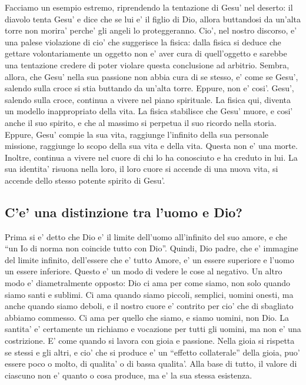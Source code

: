 Facciamo un esempio estremo, riprendendo la tentazione di Gesu' nel deserto: il diavolo tenta Gesu' e dice che se lui e' il figlio di Dio, allora buttandosi da un'alta torre non morira' perche' gli angeli lo proteggeranno. Cio', nel nostro discorso, e' una palese violazione di cio' che suggerisce la fisica: dalla fisica si deduce che gettare volontariamente un oggetto non e' aver cura di quell'oggetto e sarebbe una tentazione credere di poter violare questa conclusione ad arbitrio. Sembra, allora, che Gesu' nella sua passione non abbia cura di se stesso, e' come se Gesu', salendo sulla croce si stia buttando da un'alta torre. Eppure, non e' cosi'. Gesu', salendo sulla croce, continua a vivere nel piano spirituale. La fisica qui, diventa un modello inappropriato della vita. La fisica stabilisce che Gesu' muore, e cosi' anche il suo spirito, e che al massimo si perpetua il suo ricordo nella storia. Eppure, Gesu' compie la sua vita, raggiunge l'infinito della sua personale missione, raggiunge lo scopo della sua vita e della vita. Questa non e' una morte. Inoltre, continua a vivere nel cuore di chi lo ha conosciuto e ha creduto in lui. La sua identita' risuona nella loro, il loro cuore si accende di una nuova vita, si accende dello stesso potente spirito di Gesu'.




\subsection{C'e' una distinzione tra l'uomo e Dio?}
Prima si e' detto che Dio e' il limite dell'uomo all'infinito del suo amore, e che ``un Io di norma non coincide tutto con Dio''.
Quindi, Dio padre, che e' immagine del limite infinito, dell'essere che e' tutto Amore, e' un essere superiore e l'uomo un essere inferiore.
Questo e' un modo di vedere le cose al negativo. Un altro modo e' diametralmente opposto: Dio ci ama per come siamo, non solo quando siamo santi e sublimi. Ci ama quando siamo piccoli, semplici, uomini onesti, ma anche quando siamo deboli, e il nostro cuore e' contrito per cio' che di sbagliato abbiamo commesso. Ci ama per quello che siamo, e siamo uomini, non Dio. La santita' e' certamente un richiamo e vocazione per tutti gli uomini, ma non e' una costrizione. E' come quando si lavora con gioia e passione. Nella gioia si rispetta se stessi e gli altri, e cio' che si produce e' un ``effetto collaterale'' della gioia, puo' essere poco o molto, di qualita' o di bassa qualita'.  Alla base di tutto, il valore di ciascuno non e' quanto o cosa produce, ma e' la sua stessa esistenza.

